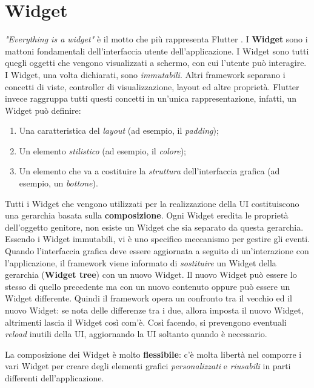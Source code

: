 \section{Widget}
\textit{"Everything is a widget"} è il motto che più rappresenta Flutter \cite{flutter_technical_overview}.
I \textbf{Widget} sono i mattoni fondamentali dell'interfaccia utente dell'applicazione. I Widget sono tutti quegli oggetti che vengono visualizzati a schermo, con cui l'utente può interagire. I Widget, una volta dichiarati, sono \textit{immutabili}. Altri framework separano i concetti di viste, controller di visualizzazione, layout ed altre proprietà. Flutter invece raggruppa tutti questi concetti in un'unica rappresentazione, infatti, un Widget può definire:
\begin{enumerate}
	\item Una caratteristica del \textit{layout} (ad esempio, il \textit{padding});
	\item Un elemento \textit{stilistico} (ad esempio, il \textit{colore});
	\item Un elemento che va a costituire la \textit{struttura} dell'interfaccia grafica (ad esempio, un \textit{bottone}).
\end{enumerate}

Tutti i Widget che vengono utilizzati per la realizzazione della UI costituiscono una gerarchia basata sulla \textbf{composizione}. Ogni Widget eredita le proprietà dell'oggetto genitore, non esiste un Widget che sia separato da questa gerarchia. Essendo i Widget immutabili, vi è uno specifico meccanismo per gestire gli eventi. Quando l'interfaccia grafica deve essere aggiornata a seguito di un'interazione con l'applicazione, il framework viene informato di \textit{sostituire} un Widget della gerarchia (\textbf{Widget tree}) con un nuovo Widget. Il nuovo Widget può essere lo stesso di quello precedente ma con un nuovo contenuto oppure può essere un Widget differente. Quindi il framework opera un confronto tra il vecchio ed il nuovo Widget: se nota delle differenze tra i due, allora imposta il nuovo Widget, altrimenti lascia il Widget così com'è. Così facendo, si prevengono eventuali \textit{reload} inutili della UI, aggiornando la UI soltanto quando è necessario.

La composizione dei Widget è molto \textbf{flessibile}: c'è molta libertà nel comporre i vari Widget per creare degli elementi grafici \textit{personalizzati} e \textit{riusabili} in parti differenti dell'applicazione.

